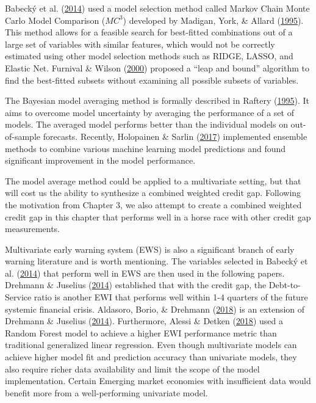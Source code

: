 \documentclass[
  12pt,
]{article}
\begin{document}
Babecký et al. (\protect\hyperlink{ref-babecky_banking_2014}{2014}) used a model selection method called Markov Chain Monte Carlo Model Comparison (\(MC^3\)) developed by Madigan, York, \& Allard (\protect\hyperlink{ref-madigan_bayesian_1995}{1995}). This method allows for a feasible search for best-fitted combinations out of a large set of variables with similar features, which would not be correctly estimated using other model selection methods such as RIDGE, LASSO, and Elastic Net. Furnival \& Wilson (\protect\hyperlink{ref-furnival_regressions_2000}{2000}) proposed a ``leap and bound'' algorithm to find the best-fitted subsets without examining all possible subsets of variables.

The Bayesian model averaging method is formally described in Raftery (\protect\hyperlink{ref-raftery_bayesian_1995}{1995}). It aims to overcome model uncertainty by averaging the performance of a set of models. The averaged model performs better than the individual models on out-of-sample forecasts. Recently, Holopainen \& Sarlin (\protect\hyperlink{ref-holopainen_toward_2017}{2017}) implemented ensemble methods to combine various machine learning model predictions and found significant improvement in the model performance.

The model average method could be applied to a multivariate setting, but that will cost us the ability to synthesize a combined weighted credit gap. Following the motivation from Chapter 3, we also attempt to create a combined weighted credit gap in this chapter that performs well in a horse race with other credit gap measurements.

Multivariate early warning system (EWS) is also a significant branch of early warning literature and is worth mentioning. The variables selected in Babecký et al. (\protect\hyperlink{ref-babecky_banking_2014}{2014}) that perform well in EWS are then used in the following papers. Drehmann \& Juselius (\protect\hyperlink{ref-drehmann_evaluating_2014}{2014}) established that with the credit gap, the Debt-to-Service ratio is another EWI that performs well within 1-4 quarters of the future systemic financial crisis. Aldasoro, Borio, \& Drehmann (\protect\hyperlink{ref-aldasoro_early_2018}{2018}) is an extension of Drehmann \& Juselius (\protect\hyperlink{ref-drehmann_evaluating_2014}{2014}). Furthermore, Alessi \& Detken (\protect\hyperlink{ref-alessi_identifying_2018}{2018}) used a Random Forest model to achieve a higher EWI performance metric than traditional generalized linear regression. Even though multivariate models can achieve higher model fit and prediction accuracy than univariate models, they also require richer data availability and limit the scope of the model implementation. Certain Emerging market economies with insufficient data would benefit more from a well-performing univariate model.
\end{document}
